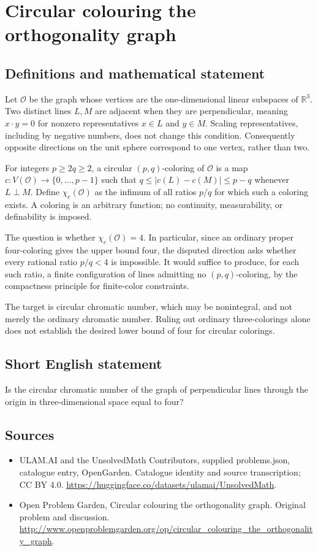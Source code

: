 \documentclass[11pt,a4paper]{article}
\begin{document}
\section*{Circular colouring the orthogonality graph}\label{statement}

\subsection{Definitions and mathematical statement}
Let $\mathcal O$ be the graph whose vertices are the one-dimensional linear subspaces of $\mathbb R^3$. Two distinct lines $L,M$ are adjacent when they are perpendicular, meaning $x\cdot y=0$ for nonzero representatives $x\in L$ and $y\in M$. Scaling representatives, including by negative numbers, does not change this condition. Consequently opposite directions on the unit sphere correspond to one vertex, rather than two.

For integers $p\ge2q\ge2$, a circular $(p,q)$-coloring of $\mathcal O$ is a map $c:V(\mathcal O)\to\{0,\ldots,p-1\}$ such that $q\le|c(L)-c(M)|\le p-q$ whenever $L\perp M$. Define $\chi_c(\mathcal O)$ as the infimum of all ratios $p/q$ for which such a coloring exists. A coloring is an arbitrary function; no continuity, measurability, or definability is imposed.

The question is whether $\chi_c(\mathcal O)=4$. In particular, since an ordinary proper four-coloring gives the upper bound four, the disputed direction asks whether every rational ratio $p/q<4$ is impossible. It would suffice to produce, for each such ratio, a finite configuration of lines admitting no $(p,q)$-coloring, by the compactness principle for finite-color constraints.

The target is circular chromatic number, which may be nonintegral, and not merely the ordinary chromatic number. Ruling out ordinary three-colorings alone does not establish the desired lower bound of four for circular colorings.
\subsection{Short English statement}
Is the circular chromatic number of the graph of perpendicular lines through the origin in three-dimensional space equal to four?
\subsection{Sources}
\begin{itemize}
\item[S1] ULAM.AI and the UnsolvedMath Contributors, supplied problems.json, catalogue entry, OpenGarden. Catalogue identity and source transcription; CC BY 4.0.
\url{https://huggingface.co/datasets/ulamai/UnsolvedMath}.
\item[S2] Open Problem Garden, Circular colouring the orthogonality graph. Original problem and discussion.
\url{http://www.openproblemgarden.org/op/circular_colouring_the_orthogonality_graph}.
\end{itemize}
\end{document}
